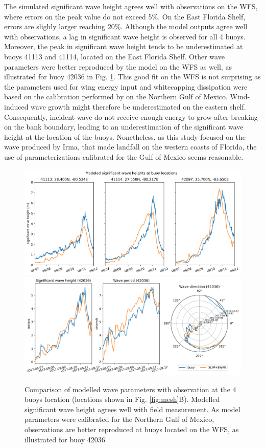 \documentclass[11pt,a4paper]{article}
\begin{document}
The simulated significant wave height agrees well with observations on the WFS, where errors on the peak value do not exceed 5\%. On the East Florida Shelf, errors are slighly larger reaching 20\%. Although the model outputs agree well with observations, a lag in significant wave height is observed for all 4 buoys. Moreover, the peak in significant wave height tends to be underestimated at buoys 41113 and 41114, located on the East Florida Shelf. Other wave parameters were better reproduced by the model on the WFS as well, as illustrated for buoy 42036 in Fig. \ref{fig:waves}. This good fit on the WFS is not surprising as the parameters used for wing energy input and whitecapping dissipation were based on the calibration performed by \citep{siadatmousavi2011evaluation} on the Northern Gulf of Mexico. Wind-induced wave growth might therefore be underestimated on the eastern shelf. Consequently, incident wave do not receive enough energy to grow after breaking on the bank boundary, leading to an underestimation of the significant wave height at the location of the buoys. Nonetheless, as this study focused on the wave produced by Irma, that made landfall on the western coasts of Florida, the use of parameterizations calibrated for the Gulf of Mexico seems reasonable.

\begin{figure}
    \centering
    \includegraphics[width=\textwidth]{fig/hsig_with_map_ww3.png}
    \includegraphics[width=\textwidth]{fig/waves_ww3_5km-00002.png}
    \caption{Comparison of modelled wave parameters with observation at the 4 buoys location (locations shown in Fig. \ref{fig:mesh}B). Modelled significant wave height agrees well with field measurement. As model parameters were calibrated for the Northern Gulf of Mexico, observations are better reproduced at buoys located on the WFS, as illustrated for buoy 42036}
    \label{fig:waves}
\end{figure}
\end{document}

